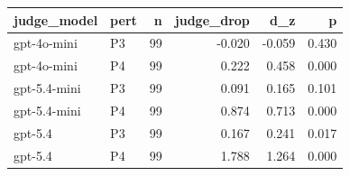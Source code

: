 \begin{tabular}{llrrrr}
\toprule
judge_model & pert & n & judge_drop & d_z & p \\
\midrule
gpt-4o-mini & P3 & 99 & -0.020 & -0.059 & 0.430 \\
gpt-4o-mini & P4 & 99 & 0.222 & 0.458 & 0.000 \\
gpt-5.4-mini & P3 & 99 & 0.091 & 0.165 & 0.101 \\
gpt-5.4-mini & P4 & 99 & 0.874 & 0.713 & 0.000 \\
gpt-5.4 & P3 & 99 & 0.167 & 0.241 & 0.017 \\
gpt-5.4 & P4 & 99 & 1.788 & 1.264 & 0.000 \\
\bottomrule
\end{tabular}

